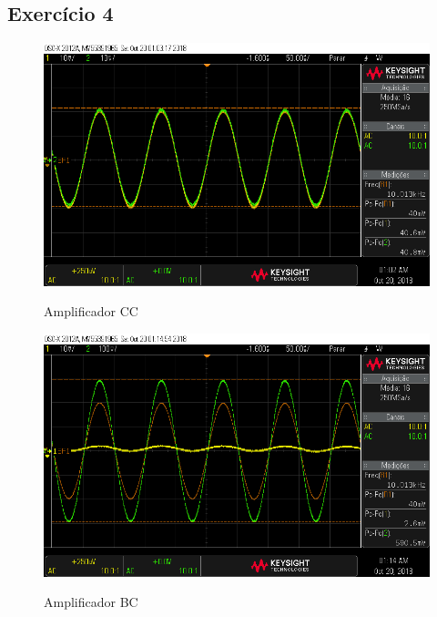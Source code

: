 \documentclass[journal, a4paper]{IEEEtran}
\begin{document}
        \subsection{Exercício 4}
            \begin{figure}[H]
        		\begin{center}
        		\caption{Amplificador CC}
        		\includegraphics[width=\columnwidth]{scope_0.png}
        		\label{scope0}
        		\end{center}
        	\end{figure}

            \begin{figure}[H]
        		\begin{center}
        		\caption{Amplificador BC}
        		\includegraphics[width=\columnwidth]{scope_1.png}
        		\label{scope1}
        		\end{center}
        	\end{figure}        
\end{document}
